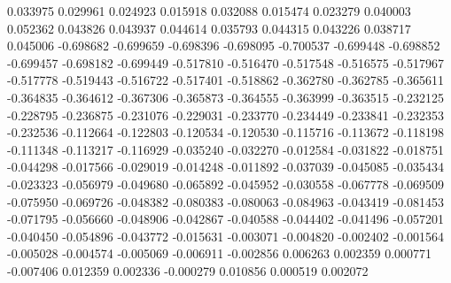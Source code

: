 0.033975
0.029961
0.024923
0.015918
0.032088
0.015474
0.023279
0.040003
0.052362
0.043826
0.043937
0.044614
0.035793
0.044315
0.043226
0.038717
0.045006
-0.698682
-0.699659
-0.698396
-0.698095
-0.700537
-0.699448
-0.698852
-0.699457
-0.698182
-0.699449
-0.517810
-0.516470
-0.517548
-0.516575
-0.517967
-0.517778
-0.519443
-0.516722
-0.517401
-0.518862
-0.362780
-0.362785
-0.365611
-0.364835
-0.364612
-0.367306
-0.365873
-0.364555
-0.363999
-0.363515
-0.232125
-0.228795
-0.236875
-0.231076
-0.229031
-0.233770
-0.234449
-0.233841
-0.232353
-0.232536
-0.112664
-0.122803
-0.120534
-0.120530
-0.115716
-0.113672
-0.118198
-0.111348
-0.113217
-0.116929
-0.035240
-0.032270
-0.012584
-0.031822
-0.018751
-0.044298
-0.017566
-0.029019
-0.014248
-0.011892
-0.037039
-0.045085
-0.035434
-0.023323
-0.056979
-0.049680
-0.065892
-0.045952
-0.030558
-0.067778
-0.069509
-0.075950
-0.069726
-0.048382
-0.080383
-0.080063
-0.084963
-0.043419
-0.081453
-0.071795
-0.056660
-0.048906
-0.042867
-0.040588
-0.044402
-0.041496
-0.057201
-0.040450
-0.054896
-0.043772
-0.015631
-0.003071
-0.004820
-0.002402
-0.001564
-0.005028
-0.004574
-0.005069
-0.006911
-0.002856
0.006263
0.002359
0.000771
-0.007406
0.012359
0.002336
-0.000279
0.010856
0.000519
0.002072
